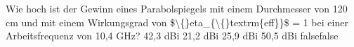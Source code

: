     {Wie hoch ist der Gewinn eines Parabolspiegels mit einem Durchmesser von 120 cm und mit einem Wirkungsgrad von \$\textbackslash\{\}eta\_\{\textbackslash\{\}textrm\{eff\}\}\$ = 1 bei einer Arbeitsfrequenz von 10,4 GHz?}
    {42,3 dBi}
    {21,2 dBi}
    {25,9 dBi}
    {50,5 dBi}
    {false}{false}